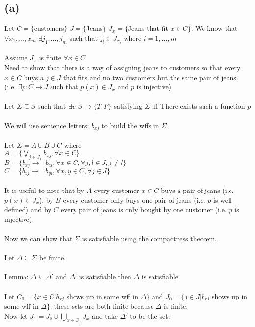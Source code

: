 \documentclass[11pt, a4paper, oneside]{article}
\begin{document}
\subsection*{(a)}
Let $C = \{$customers$\}$ $J = \{$Jeans$\}$ $J_x = \{$Jeans that fit $x \in C\}$. We know that $\forall x_1,\ldots
   ,x_m$ $\exists j_1,\ldots,j_m$ such that $j_i \in J_{x_i}$ where $i = 1, \ldots, m$\\
\\
Assume $J_x$ is finite $\forall x \in C$\\
Need to show that there is a way of assigning jeans to customers so that every $x \in C$ buys a $j \in J$ that fits
and no two customers but the same pair of jeans.\\
(i.e. $\exists p: C \rightarrow J$ such that $p(x) \in J_x$ and $p$ is injective)\\
\\
Let $\Sigma \subseteq \bar{\mathscr{S}}$ such that $\exists v:\mathscr{S} \rightarrow \{T, F\}$ satisfying $\Sigma$
   iff There exists such a function $p$\\
\\
We will use sentence letters: $b_{xj}$ to build the wffs in $\Sigma$\\
\\
Let $\Sigma = A \cup B \cup C$ where\\
$A = \{ \bigvee_{j \in J_x} b_{xj}, \forall x \in C\}$\\
$B = \{b_{xj} \rightarrow \neg{b_{xl}}, \forall x \in C, \forall j,l \in J, j \neq l \}$\\
$C = \{ b_{xj} \rightarrow \neg{b_{yj}}, \forall x,y \in C, \forall j \in J \}$\\
\\
It is useful to note that by $A$ every customer $x \in C$ buys a pair of jeans (i.e. $p(x) \in J_{x}$), by $B$
every customer only buys one pair of jeans (i.e. $p$ is well defined) and by $C$ every pair of jeans is only 
bought by one customer (i.e. $p$ is injective).\\
\\
Now we can show that $\Sigma$ is satisfiable using the compactness theorem.\\
\\
Let $\Delta \subseteq \Sigma$ be finite.\\
\\
Lemma: $\Delta \subseteq \Delta'$ and $\Delta'$ is satisfiable then $\Delta$ is satisfiable.\\
\\
Let $C_0 = \{ x \in C | b_{xj}$ shows up in some wff in $\Delta \}$ and $J_0 = \{ j \in J | b_{xj}$ shows up
in some wff in $\Delta \}$, these sets are both finite because $\Delta$ is finite.\\
Now let $J_1 = J_0 \cup \bigcup_{x \in C_0} J_x$ and take $\Delta'$ to be the set:\\
\end{document}
